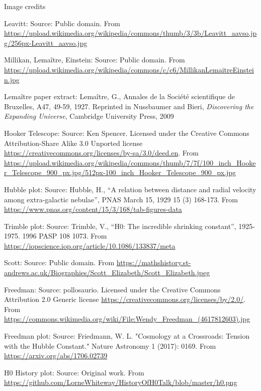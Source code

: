 \documentclass[usenames,dvipsnames,12pt,compress]{beamer}
\newcommand{\Lemaitre}[0]{Lemaître}
\begin{document}
\begin{frame}{Image credits}
  \begin{enumerate}\addtocounter{enumi}{10}
  \tiny {
  \item{Leavitt: Source: Public domain. From \url{https://upload.wikimedia.org/wikipedia/commons/thumb/3/3b/Leavitt_aavso.jpg/256px-Leavitt_aavso.jpg}}
  \item{Millikan, \Lemaitre{}, Einstein: Source: Public domain. From \url{https://upload.wikimedia.org/wikipedia/commons/c/c6/MillikanLemaitreEinstein.jpg}}
  \item{\Lemaitre{} paper extract: \Lemaitre{}, G., Annales de la Société scientifique de Bruxelles, A47, 49-59, 1927. Reprinted in Nussbaumer and Bieri, \textit{Discovering the Expanding Universe}, Cambridge University Press, 2009}
  \item{Hooker Telescope: Source: Ken Spencer. Licensed under the Creative Commons Attribution-Share Alike 3.0 Unported license \url{https://creativecommons.org/licenses/by-sa/3.0/deed.en}. From \url{https://upload.wikimedia.org/wikipedia/commons/thumb/7/7f/100_inch_Hooker_Telescope_900_px.jpg/512px-100_inch_Hooker_Telescope_900_px.jpg}}
  \item{Hubble plot: Source: Hubble, H., ``A relation between distance and radial velocity among extra-galactic nebulae'', PNAS March 15, 1929 15 (3) 168-173. From \url{https://www.pnas.org/content/15/3/168/tab-figures-data}}
  \item{Trimble plot: Source: Trimble, V., ``H0: The incredible shrinking constant'', 1925-1975. 1996 PASP 108 1073. From \url{https://iopscience.iop.org/article/10.1086/133837/meta}}
  \item{Scott: Source: Public domain. From \url{https://mathshistory.st-andrews.ac.uk/Biographies/Scott_Elizabeth/Scott_Elizabeth.jpeg}}
  \item{Freedman: Source: pollosaurio. Licensed under the Creative Commons Attribution 2.0 Generic license \url{https://creativecommons.org/licenses/by/2.0/}. From \url{https://commons.wikimedia.org/wiki/File:Wendy_Freedman_(4617812603).jpg}}
  \item{Freedman plot: Source: Friedmann, W. L. "Cosmology at a Crossroads: Tension with the Hubble Constant." Nature Astronomy 1 (2017): 0169. From \url{https://arxiv.org/abs/1706.02739}}
  \item{H0 History plot: Source: Original work. From \url{https://github.com/LorneWhiteway/HistoryOfH0Talk/blob/master/h0.png}}
  } %
  \end{enumerate}
\end{frame}
\end{document}
